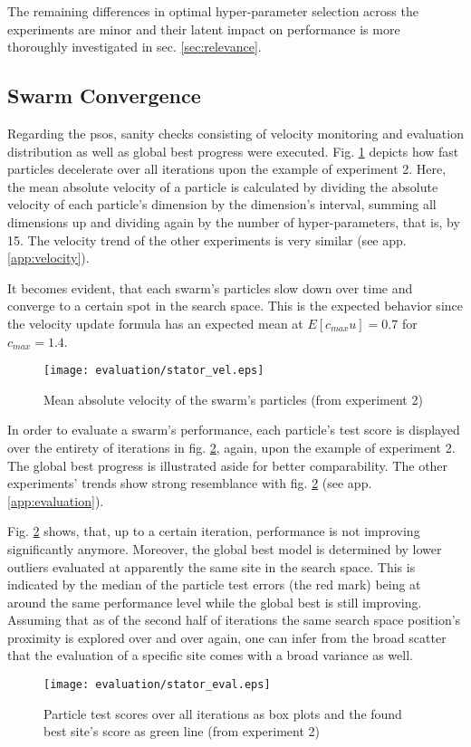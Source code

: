 The remaining differences in optimal hyper-parameter selection across the experiments are minor and their latent impact on performance is more thoroughly investigated in sec. \ref{sec:relevance}.

\subsection{Swarm Convergence}
Regarding the \glspl{pso}, sanity checks consisting of velocity monitoring and evaluation distribution as well as global best progress were executed.
Fig. \ref{fig:velocity} depicts how fast particles decelerate over all iterations upon the example of experiment 2.
Here, the mean absolute velocity of a particle is calculated by dividing the absolute velocity of each particle's dimension by the dimension's interval, summing all dimensions up and dividing again by the number of hyper-parameters, that is, by 15.
The velocity trend of the other experiments is very similar (see app. \ref{app:velocity}).

It becomes evident, that each swarm's particles slow down over time and converge to a certain spot in the search space.
This is the expected behavior since the velocity update formula has an expected mean at $E[c_{max}u] = 0.7$ for $c_{max} = 1.4$.  
\begin{figure}
	\centering
	\texttt{[image: evaluation/stator\_vel.eps]}
	\caption{Mean absolute velocity of the swarm's particles (from experiment 2)}
	\label{fig:velocity}
\end{figure}

In order to evaluate a swarm's performance, each particle's test score is displayed over the entirety of iterations in fig. \ref{fig:evaluation_development}, again, upon the example of experiment 2.
The global best progress is illustrated aside for better comparability.
The other experiments' trends show strong resemblance with fig. \ref{fig:evaluation_development} (see app. \ref{app:evaluation}).

Fig. \ref{fig:evaluation_development} shows, that, up to a certain iteration, performance is not improving significantly anymore.
Moreover, the global best model is determined by lower outliers evaluated at apparently the same site in the search space.
This is indicated by the median of the particle test errors (the red mark) being at around the same performance level while the global best is still improving.
Assuming that as of the second half of iterations the same search space position's proximity is explored over and over again, one can infer from the broad scatter that the evaluation of a specific site comes with a broad variance as well.
\begin{figure}
	\centering
	\texttt{[image: evaluation/stator\_eval.eps]}
	\caption{Particle test scores over all iterations as box plots and the found best site's score as green line (from experiment 2)}
	\label{fig:evaluation_development}
\end{figure}

